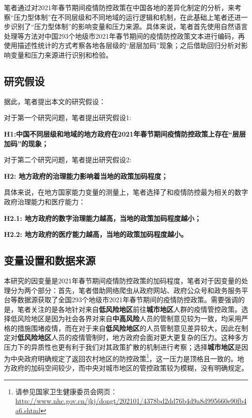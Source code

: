\documentclass[
  12pt,
]{ctexart}
\begin{document}
笔者通过对2021年春节期间疫情防控政策在中国各地的差异化制定的分析，来考察``压力型体制''在不同层级和不同地域的运行逻辑和机制，在此基础上笔者还进一步识别了``压力型体制''的影响变量和压力来源。具体来说，笔者首先使用自然语言处理等方法对中国293个地级市2021年春节期间的疫情防控政策文本进行编码，再使用描述性统计的方式考察各地各层级的``层层加码''现象；之后借助回归分析对影响变量和压力来源进行识别和检验。

\hypertarget{ux7814ux7a76ux5047ux8bbe}{%
\subsection{研究假设}\label{ux7814ux7a76ux5047ux8bbe}}

据此，笔者提出本文的研究假设：

对于第一个研究问题，笔者提出研究假设1:

\textbf{H1:中国不同层级和地域的地方政府在2021年春节期间疫情防控政策上存在``层层加码''的现象；}

对于第二个研究问题，笔者提出研究假设2:

\textbf{H2: 地方政府的治理能力影响着当地的政策加码程度；}

具体来说，在地方国家能力变量的测量上，笔者选择了和疫情防控最为相关的数字政府治理能力和医疗能力：

\textbf{H2.1: 地方政府的数字治理能力越高，当地的政策加码程度越小；}

\textbf{H2.2: 地方政府的医疗能力越高，当地的政策加码程度越小。}

\hypertarget{ux53d8ux91cfux8bbeux7f6eux548cux6570ux636eux6765ux6e90}{%
\subsection{变量设置和数据来源}\label{ux53d8ux91cfux8bbeux7f6eux548cux6570ux636eux6765ux6e90}}

本研究的因变量是2021年春节期间疫情防控政策的加码程度，笔者对于因变量的处理分为两个部分：首先，笔者借助网络爬虫从政府网站、政府公众号和政务服务平台等数据源获取了全国293个地级市2021年春节期间的疫情防控政策。需要强调的是，笔者关注的是各地针对来自\textbf{低风险地区}前往\textbf{城市地区}人群的疫情管控政策。选择低风险地区是因为社会各界对来自\textbf{中高风险}人员的管制意见较为一致，均采用严格的措施围堵疫情，而在对于来自\textbf{低风险地区}的人员管制意见差异较大，因此在制定对\textbf{低风险地区}人员的疫情管制时，地方政府会面对更大更复杂的压力。这种多方压力下的异质性也更有利于我们对其政策扩散的机制进行考察；选择\textbf{城市地区}是因为中央政府明确规定了返回农村地区的防控政策\footnote{请参见国家卫生健康委员会网页：\url{http://www.nhc.gov.cn/jkj/dongt/202101/4378bd2dd76b4d9a8d995660e90fb4a6.shtml}}，这一压力是顶格且一致的。地方政府的加码空间较少，而中央对城市地区的管控政策较为模糊，没有明确规定。
\end{document}

